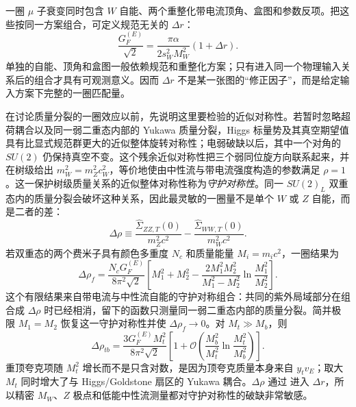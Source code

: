 一圈 $\mu$ 子衰变同时包含 $W$ 自能、两个重整化带电流顶角、盒图和参数反项。把这些按同一方案组合，可定义规范无关的 $\Delta r$：
\begin{equation}
{
\frac{G_F^{(E)}}{\sqrt2}
=\frac{\pi\alpha}{2s_W^2M_W^2}(1+\Delta r).}
\label{eq:delta-r-definition-dp11}
\end{equation}
单独的自能、顶角和盒图一般依赖规范和重整化方案；只有进入同一个物理输入关系后的组合才具有可观测意义。因而 $\Delta r$ 不是某一张图的“修正因子”，而是给定输入方案下完整的一圈匹配量。

在讨论质量分裂的一圈效应以前，先说明这里要检验的近似对称性。若暂时忽略超荷耦合以及同一弱二重态内部的 Yukawa 质量分裂，Higgs 标量势及其真空期望值具有比显式规范群更大的近似整体旋转对称性；电弱破缺以后，其中一个对角的 $SU(2)$ 仍保持真空不变。这个残余近似对称性把三个弱同位旋方向联系起来，并在树级给出 $m_W^2=m_Z^2c_W^2$，等价地使由中性流与带电流强度构造的参数满足 $\rho=1$。这一保护树级质量关系的近似整体对称性称为\emph{守护对称性}。同一 $SU(2)_L$ 双重态内的质量分裂会破坏这种关系，因此最灵敏的一圈量不是单个 $W$ 或 $Z$ 自能，而是二者的差：
\begin{equation}
\Delta\rho
\equiv
\frac{\widehat\Sigma_{ZZ,T}(0)}{m_Z^2c^2}
-\frac{\widehat\Sigma_{WW,T}(0)}{m_W^2c^2}.
\label{eq:delta-rho-definition-dp11}
\end{equation}
若双重态的两个费米子具有颜色多重度 $N_c$ 和质量能量 $M_i=m_ic^2$，一圈结果为
\begin{equation}
{
\Delta\rho_f
=\frac{N_cG_F^{(E)}}{8\pi^2\sqrt2}
\left[
M_1^2+M_2^2
-\frac{2M_1^2M_2^2}{M_1^2-M_2^2}
\ln\frac{M_1^2}{M_2^2}
\right].}
\label{eq:delta-rho-doublet-dp11}
\end{equation}
这个有限结果来自带电流与中性流自能的守护对称组合：共同的紫外局域部分在组合成 $\Delta\rho$ 时已经相消，留下的函数只测量同一弱二重态内部的质量分裂。简并极限 $M_1=M_2$ 恢复这一守护对称性并使 $\Delta\rho_f\to0$。对 $M_t\gg M_b$，则
\begin{equation}
{
\Delta\rho_{tb}
=\frac{3G_F^{(E)}M_t^2}{8\pi^2\sqrt2}
\left[
1+\mathcal O\!\left(
\frac{M_b^2}{M_t^2}\ln\frac{M_t^2}{M_b^2}
\right)
\right].}
\label{eq:delta-rho-top-dp11}
\end{equation}
重顶夸克项随 $M_t^2$ 增长而不是只含对数，是因为顶夸克质量本身来自 $y_t v_E$；取大 $M_t$ 同时增大了与 Higgs/Goldstone 扇区的 Yukawa 耦合。$\Delta\rho$ 通过 进入 $\Delta r$，所以精密 $M_W$、$Z$ 极点和低能中性流测量都对守护对称性的破缺非常敏感。
